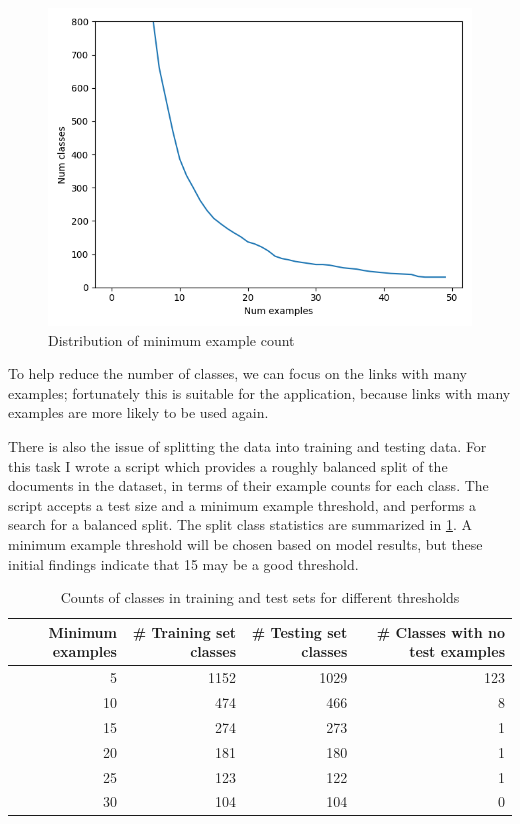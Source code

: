 \documentclass[manuscript,screen,review]{acmart}
\begin{document}
\begin{figure}[htbp]
\centering
\includegraphics[width=.9\linewidth]{images/numclasses.png}
\caption{\label{fig:orgb64256e}Distribution of minimum example count}
\end{figure}

To help reduce the number of classes, we can focus on the links with
many examples; fortunately this is suitable for the application,
because links with many examples are more likely to be used again.

There is also the issue of splitting the data into training and
testing data. For this task I wrote a script which provides a roughly
balanced split of the documents in the dataset, in terms of their
example counts for each class. The script accepts a test size and a
minimum example threshold, and performs a search for a balanced
split. The split class statistics are summarized in \ref{tab:orgf98d89e}. A
minimum example threshold will be chosen based on model results, but
these initial findings indicate that 15 may be a good threshold.

\begin{table}[htbp]
\caption{\label{tab:orgf98d89e}Counts of classes in training and test sets for different thresholds}
\centering
\begin{tabular}{rrrr}
Minimum examples & \# Training set classes & \# Testing set classes & \# Classes with no test examples\\
\hline
5 & 1152 & 1029 & 123\\
10 & 474 & 466 & 8\\
15 & 274 & 273 & 1\\
20 & 181 & 180 & 1\\
25 & 123 & 122 & 1\\
30 & 104 & 104 & 0\\
\end{tabular}
\end{table}
\end{document}
